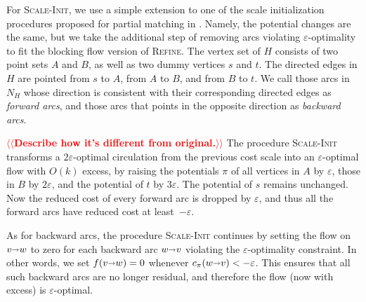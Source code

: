 \documentclass[a4paper,UKenglish]{socg-lipics-v2018}
\makeatletter
\def\note#1{\textcolor{red}{{#1}}}
\def\eps{\varepsilon}
\def\arcto{\mathord\shortrightarrow}
\def\arc#1#2{#1\arcto#2}
\def\supp{\operatorname{supp}}
\theoremstyle{plain}
\numberwithin{figure}{section}
\def\EMPH#1{\textcolor{BrickRed}{{\emph{#1}}}}
\def\n@te#1{\textsf{\boldmath \textbf{$\langle\!\langle$#1$\rangle\!\rangle$}}\leavevmode}
\def\note#1{\textcolor{red}{\n@te{#1}}}
\makeatother
\begin{document}


For \textsc{Scale-Init}, we use a simple extension to one of the scale
initialization procedures proposed for partial matching in \cite[Section~6.1]{GHKT17}.
Namely, the potential changes are the same, but we take the additional step
of removing arcs violating $\eps$-optimality to fit the blocking flow version
of \textsc{Refine}.
The vertex set of $H$ consists of two point sets $A$ and $B$, as well as two dummy vertices $s$ and $t$.  The directed edges in $H$ are pointed from $s$ to $A$, from $A$ to $B$, and from $B$ to $t$.
We call those arcs in $N_H$ whose direction is consistent with their corresponding directed edges as \EMPH{forward arcs}, and those arcs that points in the opposite direction as \EMPH{backward arcs}.

\note{Describe how it's different from original.}
The procedure \textsc{Scale-Init} transforms a $2\eps$-optimal circulation from the previous cost scale into an $\eps$-optimal flow with $O(k)$ excess, by raising the potentials $\pi$ of all vertices in $A$ by $\eps$, those in $B$ by $2\eps$, and the potential of $t$ by $3\eps$.
The potential of $s$ remains unchanged.
%
Now the reduced cost of every forward arc is dropped by $\eps$, and thus all the forward arcs have reduced cost at least~$-\eps$.

As for backward arcs, the procedure \textsc{Scale-Init} continues by setting the flow on $\arc vw$ to zero for each backward arc $\arc wv$ violating the $\eps$-optimality constraint.  In other words, we set $f(\arc vw) = 0$ whenever $c_\pi(\arc wv) < -\eps$.
This ensures that all such backward arcs are no longer residual, and therefore the flow (now with excess) is $\eps$-optimal.
\end{document}
